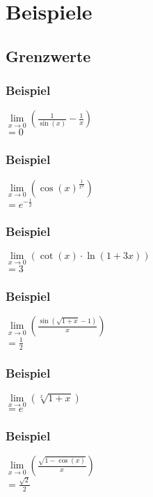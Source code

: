 \documentclass[11pt]{article} %
\begin{document}
\section{Beispiele}
\subsection{Grenzwerte}


\subsubsection{Beispiel}
$\lim\limits_{x\rightarrow 0}(\frac{1}{\sin(x)} - \frac{1}{x})$\\
$=0$
\subsubsection{Beispiel}
$\lim\limits_{x\rightarrow 0}(\cos(x)^\frac{1}{x^2})$\\
$=e^{-\frac{1}{2}}$

\subsubsection{Beispiel}
$\lim\limits_{x\rightarrow 0}(\cot(x)\cdot \ln(1+3x))$\\
$=3$
\subsubsection{Beispiel}
$\lim\limits_{x\rightarrow 0}(\frac{\sin(\sqrt{1+x}-1)}{x})$\\
$=\frac{1}{2}$
\subsubsection{Beispiel}
$\lim\limits_{x\rightarrow 0}(\sqrt[x]{1+x})$\\
$=e$
\subsubsection{Beispiel}
$\lim\limits_{x\rightarrow 0}(\frac{\sqrt{1-\cos(x)}}{x})$\\
$=\frac{\sqrt2}{2}$
\end{document}
